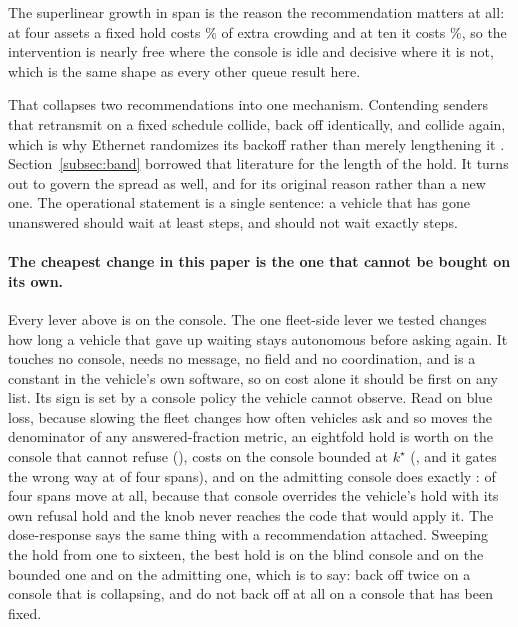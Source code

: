 \documentclass[11pt]{article}
\begin{document}
The superlinear growth in span is the reason the recommendation matters at all: at four assets a fixed hold costs \nrGeFixLoPct\% of extra crowding and at ten it costs \nrGeFixHiPct\%, so the intervention is nearly free where the console is idle and decisive where it is not, which is the same shape as every other queue result here.

That collapses two recommendations into one mechanism. Contending senders that retransmit on a fixed schedule collide, back off identically, and collide again, which is why Ethernet randomizes its backoff rather than merely lengthening it \citep{metcalfe1976ethernet}. Section~\ref{subsec:band} borrowed that literature for the length of the hold. It turns out to govern the spread as well, and for its original reason rather than a new one. The operational statement is a single sentence: a vehicle that has gone unanswered should wait at least \qBandFloor{} steps, and should not wait exactly \qBandFloor{} steps.

\paragraph{The cheapest change in this paper is the one that cannot be bought on its own.} Every lever above is on the console. The one fleet-side lever we tested changes how long a vehicle that gave up waiting stays autonomous before asking again. It touches no console, needs no message, no field and no coordination, and is a constant in the vehicle's own software, so on cost alone it should be first on any list. Its sign is set by a console policy the vehicle cannot observe. Read on blue loss, because slowing the fleet changes how often vehicles ask and so moves the denominator of any answered-fraction metric, an eightfold hold is worth \FlBlindEight{} on the console that cannot refuse (\FlBlindEightV{}), costs \FlBoundEight{} on the console bounded at $k^{\star}$ (\FlBoundEightV{}, and it gates the wrong way at \FlBoundMoves{} of four spans), and on the admitting console does exactly \FlAdmitEight{}: \FlAdmitMoves{} of four spans move at all, because that console overrides the vehicle's hold with its own refusal hold and the knob never reaches the code that would apply it. The dose-response says the same thing with a recommendation attached. Sweeping the hold from one to sixteen, the best hold is \FlHoldBlind{} on the blind console and \FlHoldBound{} on the bounded one and \FlHoldAdmit{} on the admitting one, which is to say: back off twice on a console that is collapsing, and do not back off at all on a console that has been fixed.
\end{document}
